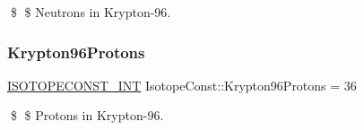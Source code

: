 \$ \$ Neutrons in Krypton-\/96. \mbox{\label{group___isotope_const-_krypton-_kr96_ga1eb276d6bcfb10210e3b78b7291bdb0c}} 
\subsubsection{\texorpdfstring{Krypton96\+Protons}{Krypton96Protons}}
{\footnotesize\ttfamily \mbox{\hyperlink{group___isotope_const-_macros_ga5f18360b3e99483a35c32d789e62621c}{I\+S\+O\+T\+O\+P\+E\+C\+O\+N\+S\+T\+\_\+\+I\+NT}} Isotope\+Const\+::\+Krypton96\+Protons = 36}

\$ \$ Protons in Krypton-\/96. 
